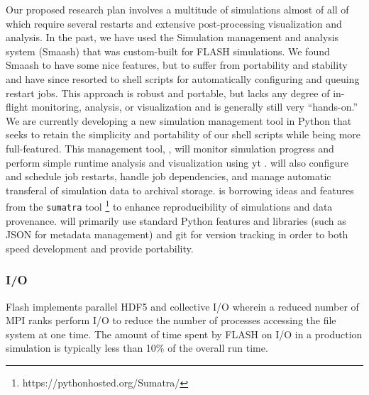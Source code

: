 Our proposed research plan involves a multitude of simulations almost of all of which require several restarts and extensive post-processing visualization and analysis.
In the past, we have used the Simulation management and analysis
system (Smaash) that was custom-built for FLASH simulations.
We found Smaash to have some nice features, but to suffer from portability and stability and have since resorted to shell scripts for automatically configuring and queuing restart jobs.
This approach is robust and portable, but lacks any degree of in-flight monitoring, analysis, or visualization and is generally still very ``hands-on.''
We are currently developing a new simulation management tool in Python that seeks to retain the simplicity and portability of our shell scripts while being more full-featured.
This management tool, \SIMpliPy, will monitor simulation progress and perform simple runtime analysis and visualization using yt \citep{Turk:2011}.
\SIMpliPy will also configure and schedule job restarts, handle job dependencies, and manage automatic transferal of simulation data to archival storage.
\SIMpliPy is borrowing ideas and features from the {\tt sumatra} tool \footnote{https://pythonhosted.org/Sumatra/} to enhance reproducibility of simulations and data provenance.
\SIMpliPy will primarily use standard Python features and libraries (such as JSON for metadata management) and git for version tracking in order to both speed development and provide portability.



\subsubsection{I/O}

Flash implements parallel HDF5 and collective I/O wherein a reduced
number of MPI ranks perform I/O to reduce the number of processes
accessing the file system at one time. The amount of time spent by
FLASH on I/O in a production simulation is typically less than 10\% of the overall run time.



